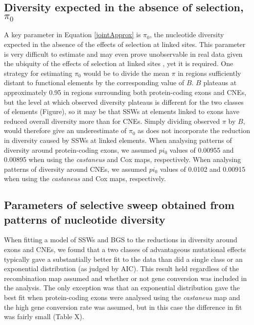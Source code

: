 \documentclass[11pt]{article}
\begin{document}
	\subsection*{Diversity expected in the absence of selection, $\pi_0$}

	A key parameter in Equation \ref{jointApprox} is $\pi_0$, the nucleotide diversity expected in the absence of the effects of selection at linked sites. This parameter is very difficult to estimate and may even prove unobservable in real data given the ubiquity of the effects of selection at linked sites \citep{RN357}, yet it is required. One strategy for estimating $\pi_0$ would be to divide the mean $\pi$ in regions sufficiently distant to functional elements by the corresponding value of $B$. $B$ plateaus at approximately 0.95 in regions surrounding both protein-coding exons and CNEs, but the level at which observed diversity plateaus is different for the two classes of elements (Figure), so it may be that SSWs at elements linked to exons have reduced overall diversity more than for CNEs. Simply dividing observed $\pi$ by $B$, would therefore give an underestimate of $\pi_0$ as does not incorporate the reduction in diversity caused by SSWs at linked elements. 	When analysing patterns of diversity around protein-coding exons, we assumed $pi_0$ values of 0.00955 and 0.00895 when using the \textit{castaneus} and Cox maps, respectively. When analysing patterns of diversity around CNEs, we assumed $pi_0$ values of 0.0102 and 0.00915 when using the \textit{castaneus} and Cox maps, respectively. 
	
\subsection*{Parameters of selective sweep obtained from patterns of nucleotide diversity}

	When fitting a model of SSWs and BGS to the reductions in diversity around exons and CNEs, we found that a two classes of advantageous mutational effects typically gave a substantially better fit to the data than did a single class or an exponential distribution (as judged by AIC). This result held regardless of the recombination map assumed and whether or not gene conversion was included in the analysis. The only exception was that an exponential distribution gave the best fit when protein-coding exons were analysed using the \textit{castaneus} map and the high gene conversion rate was assumed, but in this case the difference in fit was fairly small (Table X).
	
\end{document}
